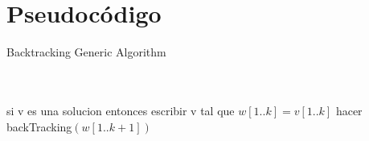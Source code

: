 \documentclass[conference]{IEEEtran}
\begin{document}
\section{Pseudoc\'odigo}
  \begin{algorithm}
   \caption{Backtracking  Generic Algorithm}
    \begin{algorithmic}[1]
      \\
		\\
        \State si v es una solucion entonces escribir v
        \State tal que $w[1..k] = v[1..k]$
        \State hacer backTracking$(w[1..k+1])$
        \EndFor
       \EndFunction
\end{algorithmic}
\end{algorithm}
\end{document}
